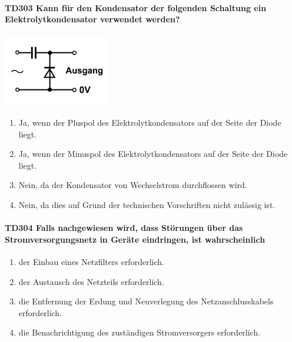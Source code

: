 \documentclass[8pt]{article}
\begin{document}
\begin{enumerate}
\begin{enumerate}[nolistsep,label=\Alph*]
{\paragraph*{TD303 Kann für den Kondensator der folgenden Schaltung ein Elektrolytkondensator verwendet werden?}
\begin{center}
	\begin{minipage}{\linewidth}
		\centering
		\includegraphics[scale=1.0]{pics/td303_a.jpg}
	\end{minipage}
\end{center}
\begin{enumerate}[nolistsep,label=\Alph*]
\item Ja, wenn der Pluspol des Elektrolytkondensators auf der Seite der Diode liegt.
\item Ja, wenn der Minuspol des Elektrolytkondensators auf der Seite der Diode liegt.
\item Nein, da der Kondensator von Wechselstrom durchflossen wird.
\item Nein, da dies auf Grund der technischen Vorschriften nicht zulässig ist.
\end{enumerate}

\paragraph*{TD304 Falls nachgewiesen wird, dass Störungen über das Stromversorgungsnetz in Geräte eindringen, ist wahrscheinlich} 
\begin{enumerate}[nolistsep,label=\Alph*]
\item der Einbau eines Netzfilters erforderlich.
\item der Austausch des Netzteils erforderlich.
\item die Entfernung der Erdung und Neuverlegung des Netzanschlusskabels erforderlich.
\item die Benachrichtigung des zuständigen Stromversorgers erforderlich.
\end{enumerate}

}
\end{enumerate}
\end{enumerate}
\end{document}
